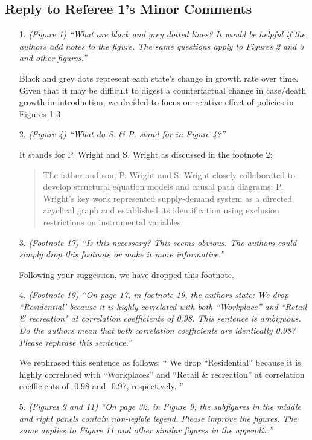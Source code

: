 \documentclass[11pt]{article}
\begin{document}
\subsection*{Reply to Referee 1's Minor Comments}
\begin{itemize}


\item[1.]  \textit{(Figure 1) ``What are black and grey dotted lines? It would be helpful if the authors add notes
to the figure. The same questions apply to Figures 2 and 3 and other figures.''}

Black and grey dots represent each state's change in growth rate over time.  Given that it may be difficult to digest a counterfactual change in case/death growth in introduction, we decided to focus on relative effect of policies in Figures 1-3. 

\item[2.]  \textit{(Figure 4) ``What do S. \& P. stand for in Figure 4?''}

It stands for 
P. Wright and S. Wright as discussed in the footnote 2:
\begin{quote}
The father and son,
P. Wright and S. Wright closely collaborated to develop structural equation models and causal path diagrams; P. Wright's
key work represented supply-demand system as a directed acyclical graph and established its identification using
exclusion restrictions on instrumental variables.
\end{quote}

\item[3.]  \textit{(Footnote 17) ``Is this necessary? This seems obvious. The authors could simply drop this
footnote or make it more informative.''}

Following your suggestion, we have dropped this footnote. 

\item[4.]  \textit{(Footnote 19) ``On page 17, in footnote 19, the authors state:
We drop ``Residential' because it is highly correlated with both ``Workplace'' and
``Retail \& recreation" at correlation coefficients of 0.98.
This sentence is ambiguous. Do the authors mean that both correlation coefficients are identically 0.98? Please rephrase this sentence.''}

We rephrased this sentence as follows: `` We drop ``Residential'' because it is highly correlated with  ``Workplaces'' and  ``Retail \& recreation''  at correlation coefficients of -0.98 and -0.97, respectively. ''

\item[5.]  \textit{(Figures 9 and 11) ``On page 32, in Figure 9, the subfigures in the middle and right panels
contain non-legible legend. Please improve the figures. The same applies to Figure 11 and
other similar figures in the appendix.''}


\end{itemize}
\end{document}
